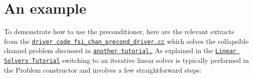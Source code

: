  

\hypertarget{index_example}{}\section{An example}\label{index_example}
To demonstrate how to use the preconditioner, here are the relevant extracts from the \href{../../../../demo_drivers/interaction/fsi_channel_seg_and_precond/fsi_chan_precond_driver.cc}{\tt driver code {\ttfamily fsi\+\_\+chan\+\_\+precond\+\_\+driver.\+cc}} which solves the collapsible channel problem discussed in \href{../../../interaction/fsi_channel_segregated_solver/html/index.html}{\tt another tutorial.} As explained in the \href{../../../linear_solvers/html/index.html}{\tt Linear Solvers Tutorial} switching to an iterative linear solver is typically performed in the {\ttfamily Problem} constructor and involves a few straightforward steps\+:


